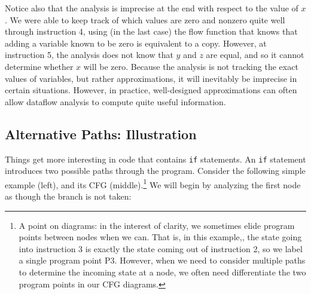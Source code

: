 \documentclass[11pt]{article}
\begin{document}
Notice also that the analysis is imprecise at the end with respect to the value of
$x$.  We were able to keep track of which values are zero and nonzero quite well
through instruction 4, using (in the last case) the flow function that knows
that adding a variable known to be zero is equivalent to a copy.
However, at instruction 5, the analysis does not know that $y$ and $z$ are
equal, and so it cannot determine whether $x$ will be zero.  Because the
analysis is not tracking the exact values of variables, but rather
approximations, it will inevitably be imprecise in certain situations.  However,
in practice, well-designed approximations can often allow dataflow analysis to
compute quite useful information.


\subsection{Alternative Paths: Illustration}
\label{sec:if}

Things get more interesting in \WhileThAddr code that contains \texttt{if}
statements.  An \texttt{if} statement introduces two possible paths through the
program. 
Consider the following simple example (left), and its CFG (middle).\footnote{A
  point on diagrams: in the interest of clarity, we sometimes
elide program points between nodes when we can. That is, in this example,,
the state going into instruction 3 is exactly the state coming out of
instruction 2, so we label a single program point P3.  However, when we need to
consider multiple paths to determine the incoming state at a node, we often need
differentiate the two program points in our CFG diagrams.}
  We will
begin by analyzing the first node as though the branch is not taken:
\end{document}
